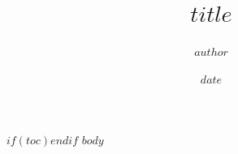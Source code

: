 \documentclass[11pt,a4paper]{article}
\title{$title$}
\author{$author$}
\date{$date$}
\begin{document}
\maketitle
$if(toc)$\tableofcontents\clearpage$endif$
$body$
\end{document}
